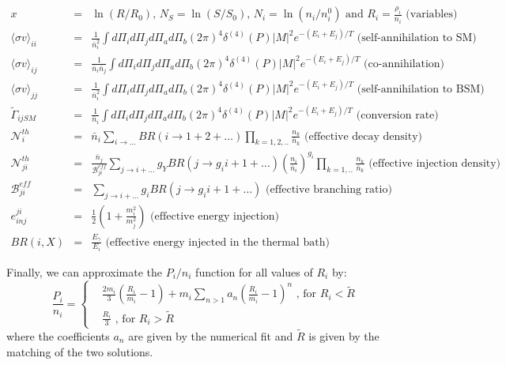 \documentclass[preprint,notoc]{JHEP3}
\def\to{\rightarrow}
\def\to{\rightarrow}
\begin{document}
\begin{eqnarray*}
x & = & \ln(R/R_0) \mbox{, } N_S = \ln(S/S_0) \mbox{, } N_i = \ln(n_i/n_i^0) \mbox{ and } R_i = \frac{\rho_i}{n_i} \mbox{ (variables)}\\
\langle \sigma v \rangle_{ii} & =  &\frac{1}{\bar{n}_i^2}\int  d\Pi_{i} d\Pi_{j} d\Pi_{a} d\Pi_{b} (2 \pi)^4 \delta^{(4)}(P) |M|^2 e^{-(E_i + E_j)/T}  \mbox{ (self-annihilation to SM)}\\
\langle \sigma v \rangle_{ij} & = & \frac{1}{\bar{n}_i \bar{n}_j}\int  d\Pi_{i} d\Pi_{j} d\Pi_{a} d\Pi_{b} (2 \pi)^4 \delta^{(4)}(P) |M|^2 e^{-(E_i + E_j)/T}  \mbox{ (co-annihilation)} \\
\langle \sigma v  \rangle_{jj} & =  &\frac{1}{\bar{n}_i^2}\int  d\Pi_{i} d\Pi_{j} d\Pi_{a} d\Pi_{b} (2 \pi)^4 \delta^{(4)}(P) |M|^2 e^{-(E_i + E_j)/T}   \mbox{ (self-annihilation to BSM)}\\
\tilde{\Gamma}_{ijSM} & =  &\frac{1}{\bar{n}_i}\int  d\Pi_{i} d\Pi_{j} d\Pi_{a} d\Pi_{b} (2 \pi)^4 \delta^{(4)}(P) |M|^2 e^{-(E_i + E_j)/T}    \mbox{ (conversion rate)}\\
\mathcal{N}^{th}_{i} & = &  \bar{n}_i \sum_{i \to \ldots} BR(i \to 1 + 2 +
\ldots) \prod_{k=1,2,..} \frac{n_k}{\bar{n}_k} \mbox{ (effective decay density)}\\
\mathcal{N}^{th}_{ji} & = & \frac{\bar{n}_j}{\mathcal{B}^{eff}_{ji}}
\sum_{j \to i + \ldots} g_Y BR(j \to g_i i + 1 + \ldots) \left(\frac{n_i}{\bar{n}_i}\right)^{g_i} \prod_{k=1,..} \frac{n_k}{\bar{n}_k} \mbox{ (effective injection density)}\\
\mathcal{B}^{eff}_{ji} & = & \sum_{j \to i + \ldots} g_i BR(j \to g_i i +
1+\ldots) \mbox{ (effective branching ratio)}\\
e_{inj}^{ji} & = &  \frac{1}{2}\left(1+\frac{m_i^2}{m_j^2}\right)  \mbox{ (effective energy injection)}\\
BR(i,X) & = & \frac{E_{\gamma}}{E_i} \mbox { (effective energy injected in the thermal bath)} 
\end{eqnarray*}

Finally,  we can approximate the $P_i/n_i$ function for all values of $R_i$ by:
\begin{equation}
\frac{P_i}{n_i} = \left\{ \begin{array}{rl}
& \frac{2 m_i}{3}\left( \frac{R_i}{m_i} -1 \right) + m_i \sum_{n >1} a_n \left(\frac{R_i}{m_i} -1 \right)^n  \mbox{ , for $R_i < \tilde{R}$} \\
& \frac{R_i}{3}  \mbox{ , for $R_i > \tilde{R}$} 
\end{array} \right. \label{Pfin}
\end{equation}
where the coefficients $a_n$ are given by the numerical fit and $\tilde{R}$ is given by the matching of the two solutions.
\end{document}
